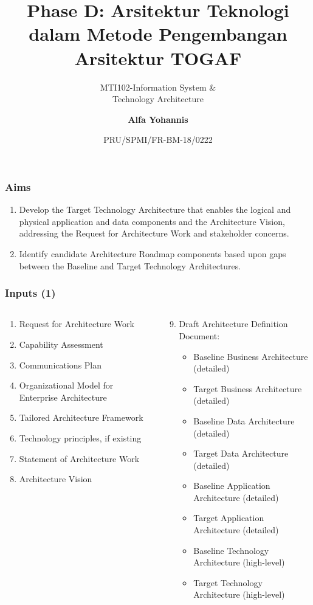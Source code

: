 \documentclass[aspectratio=169, table]{beamer}
\subtitle{MTI102-Information System \&\\Technology Architecture}
\title{\vskip-0.7cm \Large Phase D: Arsitektur Teknologi\\dalam Metode Pengembangan\\Arsitektur TOGAF}
\date[Serial]{\scriptsize {PRU/SPMI/FR-BM-18/0222}}
\author[Pradita]{\small {\textbf{Alfa Yohannis}}}
\begin{document}
\frame{\titlepage}

\begin{frame}
\frametitle{Aims}
\begin{enumerate}
	\item Develop the Target Technology Architecture that enables the logical and physical application and data components and the Architecture Vision, addressing the Request for Architecture Work and stakeholder concerns.
	\item Identify candidate Architecture Roadmap components based upon gaps between the Baseline and Target Technology Architectures.
\end{enumerate}
\end{frame}

\begin{frame}
	\frametitle{Inputs (1)}
	\vspace{20pt}
	\begin{columns}[onlytextwidth]
		\begin{column}{0.45\textwidth}
			\begin{enumerate}
				\item Request for Architecture Work
				\item Capability Assessment
				\item Communications Plan
				\item Organizational Model for Enterprise Architecture
				\item Tailored Architecture Framework
				\item Technology principles, if existing
				\item Statement of Architecture Work
				\item Architecture Vision
			\end{enumerate}
		\end{column}
		\begin{column}{0.55\textwidth}
			\begin{enumerate}
				\setcounter{enumi}{8}
				\item Draft Architecture Definition Document:
				\begin{itemize}
					\item Baseline Business Architecture (detailed)
					\item Target Business Architecture (detailed)
					\item Baseline Data Architecture (detailed)
					\item Target Data Architecture (detailed)
					\item Baseline Application Architecture (detailed)
					\item Target Application Architecture (detailed)
					\item Baseline Technology Architecture (high-level)
					\item Target Technology Architecture (high-level)
				\end{itemize}
			\end{enumerate}
		\end{column}
	\end{columns}
\end{frame}
\end{document}

